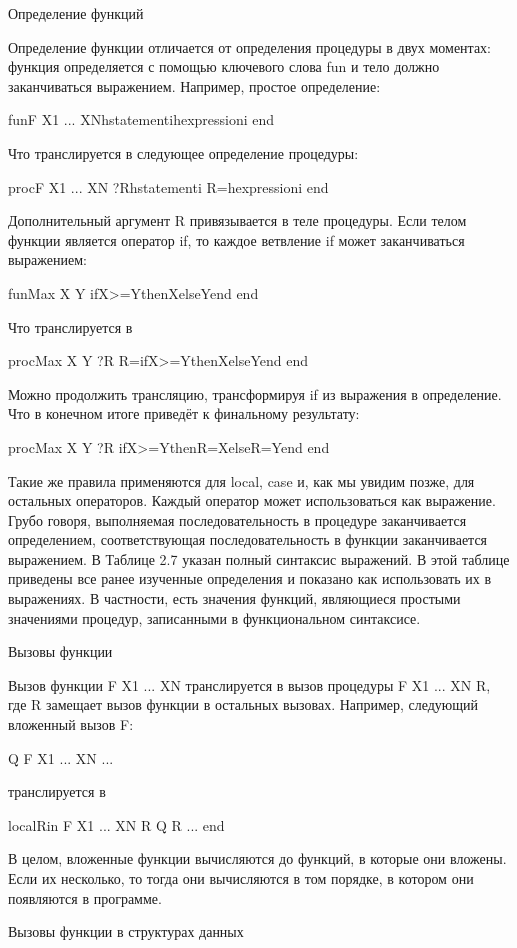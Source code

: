 Определение функций

Определение функции отличается от определения процедуры в двух моментах: функция определяется с помощью ключевого слова fun и тело должно заканчиваться выражением. Например, простое определение:

fun{F X1 ... XN}hstatementihexpressioni end

Что транслируется в следующее определение процедуры:

proc{F X1 ... XN ?R}hstatementi R=hexpressioni end

Дополнительный аргумент R привязывается в теле процедуры. Если телом функции является оператор if, то каждое ветвление if может заканчиваться выражением:

fun{Max X Y}
ifX>=YthenXelseYend
end

Что транслируется в

proc{Max X Y ?R}
R=ifX>=YthenXelseYend
end

Можно продолжить трансляцию, трансформируя if из выражения в определение. Что в конечном итоге приведёт к финальному результату:

proc{Max X Y ?R}
ifX>=YthenR=XelseR=Yend
end

Такие же правила применяются для local, case и, как мы увидим позже, для остальных операторов. Каждый оператор может использоваться как выражение. Грубо говоря, выполняемая последовательность в процедуре заканчивается определением, соответствующая последовательность в функции заканчивается выражением. В Таблице 2.7 указан полный синтаксис выражений. В этой таблице приведены все ранее изученные определения и показано как использовать их в выражениях. В частности, есть значения функций, являющиеся простыми значениями процедур, записанными в функциональном синтаксисе.

Вызовы функции

Вызов функции {F X1 ... XN} транслируется в вызов процедуры {F X1 ... XN R}, где R замещает вызов функции в остальных вызовах. Например, следующий вложенный вызов F:

{Q {F X1 ... XN} ... }

транслируется в

localRin
{F X1 ... XN R}
{Q R ... }
end

В целом, вложенные функции вычисляются до функций, в которые они вложены. Если их несколько, то тогда они вычисляются в том порядке, в котором они появляются в программе.

Вызовы функции в структурах данных


